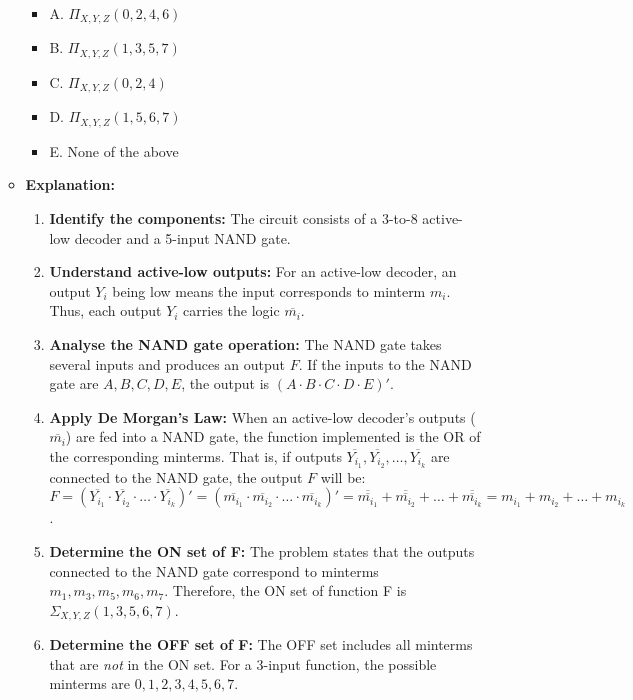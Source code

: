 \documentclass{article}
\begin{document}
\begin{itemize}
\begin{itemize}
        \begin{itemize}
            \item A. $\Pi_{X,Y,Z} (0, 2, 4, 6)$
            \item B. $\Pi_{X,Y,Z} (1, 3, 5, 7)$
            \item C. $\Pi_{X,Y,Z} (0, 2, 4)$
            \item D. $\Pi_{X,Y,Z} (1, 5, 6, 7)$
            \item E. None of the above
        \end{itemize}

    \item \textbf{Explanation:}

        \begin{enumerate}
            \item \textbf{Identify the components:} The circuit consists of a 3-to-8 active-low decoder and a 5-input NAND gate.
            \item \textbf{Understand active-low outputs:} For an active-low decoder, an output $Y_i$ being low means the input corresponds to minterm $m_i$. Thus, each output $Y_i$ carries the logic $\overline{m_i}$.
            \item \textbf{Analyse the NAND gate operation:} The NAND gate takes several inputs and produces an output $F$. If the inputs to the NAND gate are $A, B, C, D, E$, the output is $(A \cdot B \cdot C \cdot D \cdot E)'$.
            \item \textbf{Apply De Morgan's Law:} When an active-low decoder's outputs ($\overline{m_i}$) are fed into a NAND gate, the function implemented is the OR of the corresponding minterms. That is, if outputs $\overline{Y_{i_1}}, \overline{Y_{i_2}}, \dots, \overline{Y_{i_k}}$ are connected to the NAND gate, the output $F$ will be: $F = (\overline{Y_{i_1}} \cdot \overline{Y_{i_2}} \cdot \dots \cdot \overline{Y_{i_k}})' = (\overline{m_{i_1}} \cdot \overline{m_{i_2}} \cdot \dots \cdot \overline{m_{i_k}})' = \overline{\overline{m_{i_1}}} + \overline{\overline{m_{i_2}}} + \dots + \overline{\overline{m_{i_k}}} = m_{i_1} + m_{i_2} + \dots + m_{i_k}$.
            \item \textbf{Determine the ON set of F:} The problem states that the outputs connected to the NAND gate correspond to minterms $m_1, m_3, m_5, m_6, m_7$. Therefore, the ON set of function F is $\Sigma_{X,Y,Z}(1,3,5,6,7)$.
            \item \textbf{Determine the OFF set of F:} The OFF set includes all minterms that are \textit{not} in the ON set. For a 3-input function, the possible minterms are $0, 1, 2, 3, 4, 5, 6, 7$.


\end{enumerate}
\end{itemize}
\end{itemize}
\end{document}
